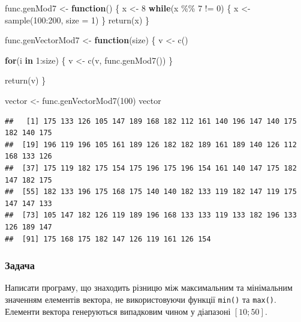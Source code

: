 \documentclass[
]{book}
\newenvironment{Shaded}{\begin{snugshade}}{\end{snugshade}}
\newcommand{\AttributeTok}[1]{\textcolor[rgb]{0.77,0.63,0.00}{#1}}
\newcommand{\ControlFlowTok}[1]{\textcolor[rgb]{0.13,0.29,0.53}{\textbf{#1}}}
\newcommand{\DecValTok}[1]{\textcolor[rgb]{0.00,0.00,0.81}{#1}}
\newcommand{\FunctionTok}[1]{\textcolor[rgb]{0.00,0.00,0.00}{#1}}
\newcommand{\NormalTok}[1]{#1}
\newcommand{\OtherTok}[1]{\textcolor[rgb]{0.56,0.35,0.01}{#1}}
\newcommand{\SpecialCharTok}[1]{\textcolor[rgb]{0.00,0.00,0.00}{#1}}
\begin{document}
\begin{Shaded}
\begin{Highlighting}[]
\NormalTok{func.genMod7 }\OtherTok{\textless{}{-}} \ControlFlowTok{function}\NormalTok{() \{}
\NormalTok{  x }\OtherTok{\textless{}{-}} \DecValTok{8}
  \ControlFlowTok{while}\NormalTok{(x }\SpecialCharTok{\%\%} \DecValTok{7} \SpecialCharTok{!=} \DecValTok{0}\NormalTok{) \{}
\NormalTok{    x }\OtherTok{\textless{}{-}} \FunctionTok{sample}\NormalTok{(}\DecValTok{100}\SpecialCharTok{:}\DecValTok{200}\NormalTok{, }\AttributeTok{size =} \DecValTok{1}\NormalTok{)}
\NormalTok{  \}}
  \FunctionTok{return}\NormalTok{(x)}
\NormalTok{\}}

\NormalTok{func.genVectorMod7 }\OtherTok{\textless{}{-}} \ControlFlowTok{function}\NormalTok{(size) \{}
\NormalTok{  v }\OtherTok{\textless{}{-}} \FunctionTok{c}\NormalTok{()}
  
  \ControlFlowTok{for}\NormalTok{(i }\ControlFlowTok{in} \DecValTok{1}\SpecialCharTok{:}\NormalTok{size) \{}
\NormalTok{    v }\OtherTok{\textless{}{-}} \FunctionTok{c}\NormalTok{(v, }\FunctionTok{func.genMod7}\NormalTok{())}
\NormalTok{  \}}
  
  \FunctionTok{return}\NormalTok{(v)}
\NormalTok{\}}

\NormalTok{vector }\OtherTok{\textless{}{-}} \FunctionTok{func.genVectorMod7}\NormalTok{(}\DecValTok{100}\NormalTok{)}
\NormalTok{vector}
\end{Highlighting}
\end{Shaded}

\begin{verbatim}
##   [1] 175 133 126 105 147 189 168 182 112 161 140 196 147 140 175 182 140 175
##  [19] 196 119 196 105 161 189 126 182 182 189 161 189 140 126 112 168 133 126
##  [37] 175 119 182 175 154 175 196 175 196 154 161 140 147 175 182 147 182 175
##  [55] 182 133 196 175 168 175 140 140 182 133 119 182 147 119 175 147 147 133
##  [73] 105 147 182 126 119 189 196 168 133 133 119 133 182 196 133 126 189 147
##  [91] 175 168 175 182 147 126 119 161 126 154
\end{verbatim}

\hypertarget{task6121}{%
\subsubsection{Задача}\label{task6121}}

Написати програму, що знаходить різницю між максимальним та мінімальним значенням елементів вектора, не використовуючи функції \texttt{min()} та \texttt{max()}. Елементи вектора генеруються випадковим чином у діапазоні \([10;50]\).
\end{document}
